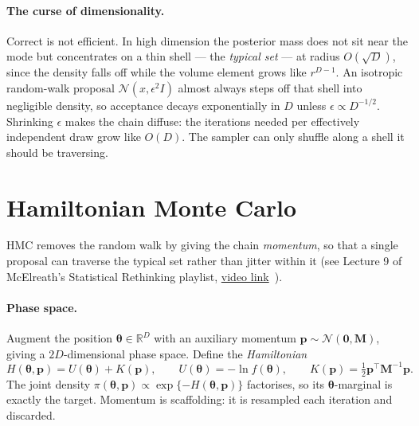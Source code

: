\documentclass[10pt,a4paper]{article}
\theoremstyle{definition}
\begin{document}
\paragraph{The curse of dimensionality.} Correct is not efficient. In high
dimension the posterior mass does not sit near the mode but concentrates on a
thin shell --- the \emph{typical set} --- at radius $O(\sqrt{D})$, since the
density falls off while the volume element grows like $r^{D-1}$. An isotropic
random-walk proposal $\mathcal{N}(x, \epsilon^{2}I)$ almost always steps off
that shell into negligible density, so acceptance decays exponentially in $D$
unless $\epsilon \propto D^{-1/2}$. Shrinking $\epsilon$ makes the chain
diffuse: the iterations needed per effectively independent draw grow like
$O(D)$. The sampler can only shuffle along a shell it should be traversing.

\section{Hamiltonian Monte Carlo}

HMC removes the random walk by giving the chain \emph{momentum}, so that a
single proposal can traverse the typical set rather than jitter within it (see Lecture 9 of McElreath's Statistical Rethinking playlist, \href{https://www.youtube.com/watch?v=Qqz5AJjyugM\&list=PLDcUM9US4XdMROZ57-OIRtIK0aOynbgZN\&index=9}{video link}~\cite{mcelreath2023_lecture09}).

\paragraph{Phase space.} Augment the position $\boldsymbol{\theta} \in
\mathbb{R}^{D}$ with an auxiliary momentum $\mathbf{p} \sim
\mathcal{N}(\mathbf{0}, \mathbf{M})$, giving a $2D$-dimensional phase space.
Define the \emph{Hamiltonian}
\[
  H(\boldsymbol{\theta}, \mathbf{p}) = U(\boldsymbol{\theta}) + K(\mathbf{p}),
  \qquad
  U(\boldsymbol{\theta}) = -\ln f(\boldsymbol{\theta}),
  \qquad
  K(\mathbf{p}) = \tfrac{1}{2}\mathbf{p}^{\!\top}\mathbf{M}^{-1}\mathbf{p}.
\]
The joint density $\pi(\boldsymbol{\theta}, \mathbf{p}) \propto
\exp\{-H(\boldsymbol{\theta}, \mathbf{p})\}$ factorises, so its
$\boldsymbol{\theta}$-marginal is exactly the target. Momentum is scaffolding:
it is resampled each iteration and discarded.
\end{document}
